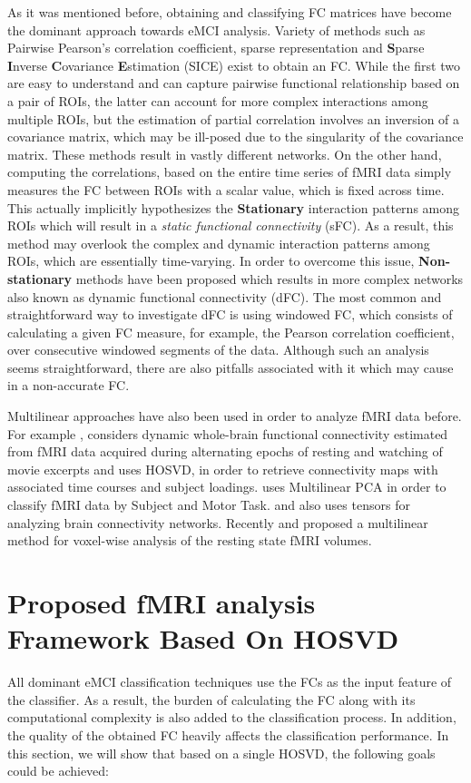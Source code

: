 \documentclass[journal]{IEEEtran}
\begin{document}
As it was mentioned before, obtaining and classifying FC matrices have become the dominant approach towards eMCI analysis. 
Variety of methods such as Pairwise Pearson’s correlation coefficient, sparse representation \cite{r10}  and \textbf{S}parse \textbf{I}nverse \textbf{C}ovariance \textbf{E}stimation (SICE)\cite{r15} exist to obtain an FC.
While the first two are easy to understand and can capture pairwise functional relationship based on a pair of ROIs, the latter can account for more complex interactions among multiple ROIs, but the estimation of partial correlation involves an inversion of a covariance matrix, which may be ill-posed due to the singularity of the covariance matrix. 
These methods result in vastly different networks\cite{r35}. On the other hand, computing the correlations, based on the entire time series of fMRI data simply measures the FC between ROIs with a scalar value, which is fixed across time. This actually implicitly hypothesizes the \textbf{Stationary} interaction patterns among ROIs which will result in a \textit{static functional connectivity} (sFC). As a result, this method may overlook the complex and dynamic interaction patterns among ROIs, which are essentially time-varying. In order to overcome this issue, \textbf{Non-stationary} methods have been proposed which results in more complex networks also known as dynamic functional connectivity (dFC)\cite{r56}. The most common and straightforward way to investigate dFC is using windowed FC, which consists of calculating a given FC measure, for example, the Pearson correlation coefficient, over consecutive windowed segments of the data\cite{r59}. Although such an analysis seems straightforward, there are also pitfalls associated with it which may cause in a non-accurate FC\cite{r57}.

Multilinear approaches have also been used in order to analyze fMRI data before. For example \cite{n1}, considers dynamic whole-brain functional connectivity
estimated from fMRI data acquired during alternating
epochs of resting and watching of movie excerpts and uses HOSVD, in order to retrieve connectivity maps with associated time courses and subject loadings. \cite{n2} uses Multilinear PCA in order to classify fMRI data 
by Subject and Motor Task. \cite{n3} and \cite{n4} also uses tensors for analyzing brain connectivity networks. Recently \cite{n5} and \cite{n6} proposed a multilinear method for voxel-wise analysis of the resting state fMRI volumes.  

\section{Proposed fMRI analysis Framework Based On HOSVD}
	All dominant eMCI classification techniques use the FCs as the input feature of the classifier. As a result, the burden of calculating the FC along with its computational complexity is also added to the classification process. 
	In addition, the quality of the obtained FC heavily affects the classification performance. In this section, we will show that based on a single HOSVD, the following goals could be achieved:
	
\end{document}
